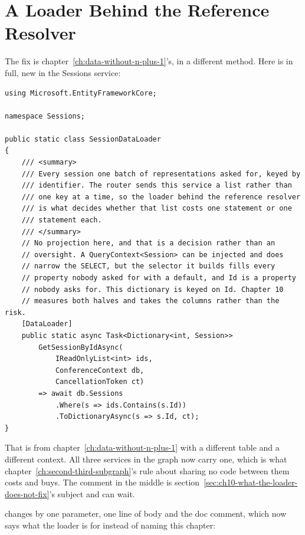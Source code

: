 \section{A Loader Behind the Reference Resolver}
\label{sec:ch10-the-loader-behind-the-resolver}

%
The fix is chapter~\ref{ch:data-without-n-plus-1}'s, in a different method.
Here is  in full, new in the Sessions service:

\begin{verbatim}
using Microsoft.EntityFrameworkCore;

namespace Sessions;

public static class SessionDataLoader
{
    /// <summary>
    /// Every session one batch of representations asked for, keyed by
    /// identifier. The router sends this service a list rather than
    /// one key at a time, so the loader behind the reference resolver
    /// is what decides whether that list costs one statement or one
    /// statement each.
    /// </summary>
    // No projection here, and that is a decision rather than an
    // oversight. A QueryContext<Session> can be injected and does
    // narrow the SELECT, but the selector it builds fills every
    // property nobody asked for with a default, and Id is a property
    // nobody asks for. This dictionary is keyed on Id. Chapter 10
    // measures both halves and takes the columns rather than the risk.
    [DataLoader]
    public static async Task<Dictionary<int, Session>>
        GetSessionByIdAsync(
            IReadOnlyList<int> ids,
            ConferenceContext db,
            CancellationToken ct)
        => await db.Sessions
            .Where(s => ids.Contains(s.Id))
            .ToDictionaryAsync(s => s.Id, ct);
}
\end{verbatim}

%
That is  from
chapter~\ref{ch:data-without-n-plus-1} with a different table and a different
context. All three services in the graph now carry one, which is what
chapter~\ref{ch:second-third-subgraph}'s rule about sharing no code between
them costs and buys. The comment in the middle is
section~\ref{sec:ch10-what-the-loader-does-not-fix}'s subject and can wait.

%
 changes by one parameter, one line of body and the doc
comment, which now says what the loader is for instead of naming this chapter:

